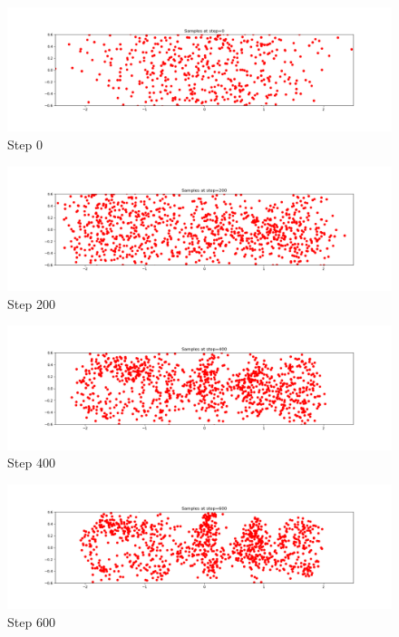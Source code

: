 \documentclass[12pt]{article}
\begin{document}
\begin{figure}[H]
    \centering
    \includegraphics[width=\linewidth]{codes/imgs/diffusion/step0.png}
    \caption{Step 0}
    \label{fig:step0}
\end{figure}

\begin{figure}[H]
    \centering
    \includegraphics[width=\linewidth]{codes/imgs/diffusion/step200.png}
    \caption{Step 200}
    \label{fig:step200}
\end{figure}

\begin{figure}[H]
    \centering
    \includegraphics[width=\linewidth]{codes/imgs/diffusion/step400.png}
    \caption{Step 400}
    \label{fig:step400}
\end{figure}

\begin{figure}[H]
    \centering
    \includegraphics[width=\linewidth]{codes/imgs/diffusion/step600.png}
    \caption{Step 600}
    \label{fig:step600}
\end{figure}
\end{document}
